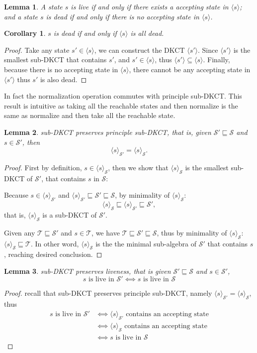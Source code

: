 \documentclass[acmsmall,screen]{acmart}
\newtheorem{corollary}{Corollary}
\newtheorem{lemma}{Lemma}
\begin{document}
\begin{lemma}
    A state \(s\) is live if and only if there exists a accepting state in \(⟨s⟩\);  
    and a state \(s\) is dead if and only if there is no accepting state in \(⟨s⟩\).
\end{lemma}

\begin{corollary}
    \(s\) is dead if and only if \(⟨s⟩\) is all dead.
\end{corollary}

\begin{proof}
    Take any state \(s' ∈ ⟨s⟩\), we can construct the DKCT \(⟨s'⟩\).
    Since \(⟨s'⟩\) is the smallest sub-DKCT that contains \(s'\), and \(s' ∈ ⟨s⟩\), thus \(⟨s'⟩ ⊆ ⟨s⟩\).
    Finally, because there is no accepting state in \(⟨s⟩\), there cannot be any accepting state in \(⟨s'⟩\) thus \(s'\) is also dead.
\end{proof}

In fact the normalization operation commutes with principle sub-DKCT. This result is intuitive as taking all the reachable states and then normalize is the same as normalize and then take all the reachable state.

\begin{lemma}
    sub-DKCT preserves principle sub-DKCT, that is, given \(𝒮' ⊑ 𝒮\) and \(s ∈ 𝒮'\), then \[⟨s⟩_{𝒮'} = ⟨s⟩_{𝒮}.\]
\end{lemma}

\begin{proof}
    First by definition, \(s ∈ ⟨s⟩_{𝒮}\),
    then we show that \(⟨s⟩_{𝒮}\) is the smallest sub-DKCT of \(𝒮'\), that contains \(s\) in \(𝒮\):

    Because \(s ∈ ⟨s⟩_{𝒮'}\) and \(⟨s⟩_{𝒮'} ⊑ 𝒮' ⊑ 𝒮\), 
    by minimality of \(⟨s⟩_{𝒮}\): \[⟨s⟩_{𝒮} ⊑ ⟨s⟩_{𝒮'} ⊑ 𝒮',\] that is, \(⟨s⟩_{𝒮}\) is a sub-DKCT of \(𝒮'\).

    Given any \(𝒯  ⊑ 𝒮'\) and \(s ∈ 𝒯\), we have \(𝒯 ⊑ 𝒮' ⊑ 𝒮\),
    thus by minimality of \(⟨s⟩_{𝒮}\): \(⟨s⟩_{𝒮} ⊑ 𝒯\).
    In other word, \(⟨s⟩_{𝒮}\) is the the minimal sub-algebra of \(𝒮'\) that contains \(s\), reaching desired conclusion.
\end{proof}

\begin{lemma}
    sub-DKCT preserves liveness, that is given \(𝒮' ⊑ 𝒮\) and \(s ∈ 𝒮'\), 
    \[s \text{ is live in \(𝒮'\)} ⟺ s \text{ is live in \(𝒮\)}\]
\end{lemma}
\begin{proof}
    recall that sub-DKCT preserves principle sub-DKCT, namely \(⟨s⟩_{𝒮'} = ⟨s⟩_{𝒮}\), thus 
    \begin{align*}
        s \text{ is live in \(𝒮'\)} 
        & ⟺ ⟨s⟩_{𝒮'} \text{ contains an accepting state} \\
        & ⟺ ⟨s⟩_{𝒮} \text{ contains an accepting state} \\
        & ⟺ s \text{ is live in \(𝒮\)} 
    \end{align*}
\end{proof}
\end{document}
